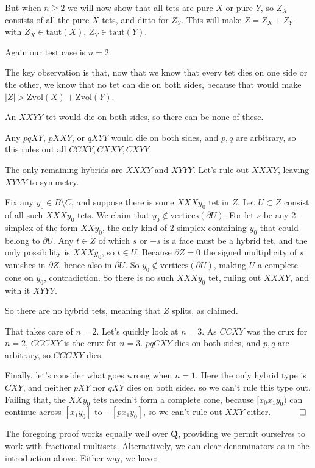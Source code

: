 \documentclass[12pt]{article}
\newcommand{\proofend}{$\quad \qed$}
\def\QQ{\mathbf{Q}}
\def\del{\partial}
\newcommand{\kw}{\mathrm}
\newcommand{\vertices}{\kw{vertices}}
\newcommand{\taut}{\kw{taut}}
\newcommand{\Zvol}{\kw{Zvol}}
\begin{document}
But when $n \geq 2$ we will now show that all tets are pure $X$ or pure $Y$,
so $Z_X$ consists of all the pure $X$ tets, and ditto for $Z_Y$.
This will make
$Z = Z_X + Z_Y$ with $Z_X \in \taut(X)$, $Z_Y \in \taut(Y)$.

Again our test case is $n=2$.

The key observation is that, now that we know that every tet dies on
one side or the other, we know that no tet can die on both sides,
because that would make $|Z| > \Zvol(X) + \Zvol(Y)$.

An $XXYY$ tet would die on both sides, so there can be none of these.

Any $pqXY$, $pXXY$, or $qXYY$ would die on both sides, and $p,q$ are arbitrary,
so this rules out all $CCXY,CXXY,CXYY$.

The only remaining hybrids are $XXXY$ and $XYYY$.
Let's rule out $XXXY$, leaving $XYYY$ to symmetry.

Fix any $y_0 \in B \setminus C$, and suppose there is
some $XXXy_0$ tet in $Z$.
Let $U \subset Z$ consist of all such $XXXy_0$ tets.
We claim that $y_0 \notin \vertices(\del U)$.
For let $s$ be any 2-simplex of the form $XXy_0$,
the only kind of 2-simplex containing $y_0$ that could belong
to $\del U$.
Any $t \in Z$ of which $s$ or $-s$ is a face must be a hybrid tet,
and the only possibility is $XXXy_0$, so $t \in U$.
Because $\del Z = 0$ the signed multiplicity of $s$
vanishes in $\del Z$,
hence also in $\del U$.
So $y_0 \notin \vertices(\del U)$,
making $U$ a complete cone on $y_0$,
contradiction.
So there is no such $XXXy_0$ tet, ruling out $XXXY$,
and with it $XYYY$.

So there are no hybrid tets, meaning that $Z$ splits, as claimed.

That takes care of $n=2$.
Let's quickly look at $n=3$.
As $CCXY$ was the crux for $n=2$,
$CCCXY$ is the crux for $n=3$.
$pqCXY$ dies on both sides, and $p,q$ are arbitrary,
so $CCCXY$ dies.

Finally, let's consider what goes wrong when $n=1$.
Here the only hybrid type is $CXY$,
and neither $pXY$ nor $qXY$ dies on both sides.
so we can't rule this type out.
Failing that, the $XXy_0$ tets needn't form a complete cone,
because $[x_0x_1y_0)$ can continue across $[x_1 y_0]$ to $-[p x_1 y_0]$,
so we can't rule out $XXY$ either.
\proofend

The foregoing proof works equally well over $\QQ$, providing we
permit ourselves to work with fractional multisets.
Alternatively, we can clear denominators as in the introduction
above.
Either way, we have:
\end{document}
